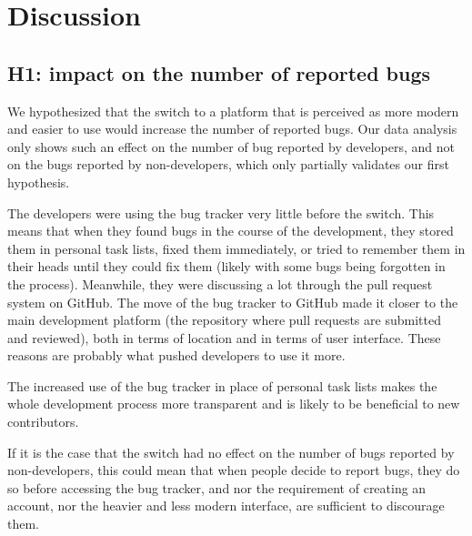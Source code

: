 \documentclass[conference]{IEEEtran}
\begin{document}
\section{Discussion}
\label{discussion}

\subsection{H1: impact on the number of reported bugs}

We hypothesized that the switch to a platform that is perceived as more modern and easier to use would increase the number of reported bugs. Our data analysis only shows such an effect on the number of bug reported by developers, and not on the bugs reported by non-developers, which only partially validates our first hypothesis.

The developers were using the bug tracker very little before the switch. This means that when they found bugs in the course of the development, they stored them in personal task lists, fixed them immediately, or tried to remember them in their heads until they could fix them (likely with some bugs being forgotten in the process). Meanwhile, they were discussing a lot through the pull request system on GitHub. The move of the bug tracker to GitHub made it closer to the main development platform (the repository where pull requests are submitted and reviewed), both in terms of location and in terms of user interface. These reasons are probably what pushed developers to use it more.

The increased use of the bug tracker in place of personal task lists makes the whole development process more transparent and is likely to be beneficial to new contributors.

If it is the case that the switch had no effect on the number of bugs reported by non-developers, this could mean that when people decide to report bugs, they do so before accessing the bug tracker, and nor the requirement of creating an account, nor the heavier and less modern interface, are sufficient to discourage them.

\end{document}
